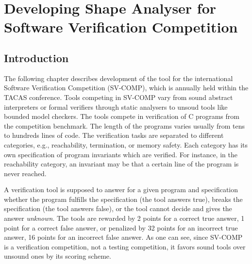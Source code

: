 {

\chapter{Developing Shape Analyser for Software Verification Competition}
\label{ch:svcomp}
\section{Introduction}
The following chapter describes development of the \forester tool \cite{foresterweb}
for the international Software Verification Competition \cite{svcompweb} (SV-COMP), which is annually held within the TACAS conference.
Tools competing in SV-COMP vary from sound abstract interpreters or formal verifiers through static analysers
to unsoud tools like bounded model checkers.
The tools compete in verification of C programs from the competition benchmark.
The length of the programs varies usually from tens to hundreds lines of code.
The verification tasks are separated to different categories, e.g., reachability,
termination, or memory safety.
Each category has its own specification of program invariants which are verified.
For instance, in the reachability category, an invariant may be that a certain line of the program is never reached.

A verification tool is supposed to answer for a given program and specification whether
the program fulfills the specification (the tool answers true), breaks the specification (the tool answers
false), or the tool cannot decide and gives the answer \emph{unknown}.
The tools are rewarded by 2 points for a correct true answer, 1 point for a correct false answer,
or penalized by 32 points for an incorrect true answer, 16 points for an incorrect false answer.
As one can see, since SV-COMP is a verification competition, not a testing competition, it favors
sound tools over unsound ones by its scoring scheme.

}
